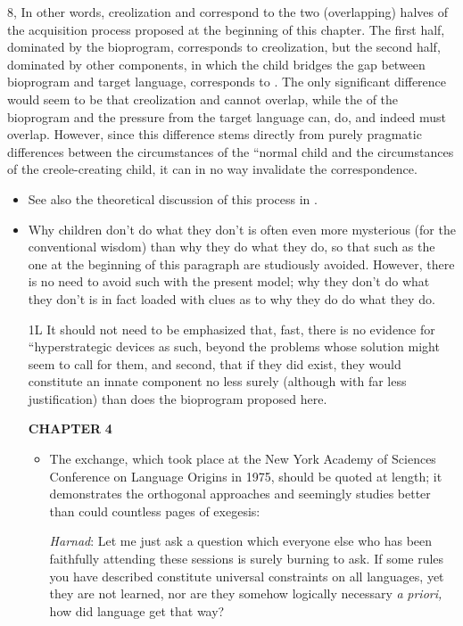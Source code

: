 \begin{itemize}
\begin{itemize}
\begin{itemize}
\begin{itemize}
\begin{itemize}
\begin{itemize}
\begin{itemize}
\begin{itemize}
\begin{itemize}
\begin{itemize}

8, In other words, creolization and  correspond to the two (overlapping) halves of the acquisition process proposed at the beginning of this chapter. The first half, dominated by the bio\-program, corresponds to creolization, but the second half, dominated by other components, in which the child bridges the gap between bioprogram and target language, corresponds to . The only significant difference would seem to be that creolization and  cannot overlap, while the  of the bioprogram and the pressure from the target language can, do, and indeed must overlap. However, since this difference stems directly from purely pragmatic differences between the circumstances of the ``normal child and the circumstances of the creole-creating child, it can in no way invalidate the correspondence.

\begin{itemize}
\item See also the theoretical discussion of this process in \citet{Bickerton1980}.
\item Why children don't do what they don't is often even more mysterious (for the conventional wisdom) than why they do what they do, so that  such as the one at the beginning of this paragraph are studiously avoided. However, there is no need to avoid such  with the present model; why they don't do what they don't is in fact loaded with clues as to why they do do what they do.

1L It should not need to be emphasized that, fast, there is no evidence for ``hyperstrategic devices as such, beyond the problems whose solution might seem to call for them, and second, that if they did exist, they would constitute an innate component no less surely (although with far less justification) than does the bioprogram proposed here.

\textbf{CHAPTER} \textbf{4}

\begin{itemize}
\item The exchange, which took place at the New York Academy of Sciences Conference on Language Origins in 1975, should be quoted at length; it demonstrates the orthogonal approaches and seemingly studies better than could countless pages of exegesis:

\textit{Harnad}: Let me just ask a question which everyone else who has been faithfully attending these sessions is surely burning to ask. If some rules you have described constitute universal constraints on all languages, yet they are not learned, nor are they somehow logically necessary \textit{a} \textit{priori,} how did language get that way?


\end{itemize}
\end{itemize}
\end{itemize}
\end{itemize}
\end{itemize}
\end{itemize}
\end{itemize}
\end{itemize}
\end{itemize}
\end{itemize}
\end{itemize}
\end{itemize}
